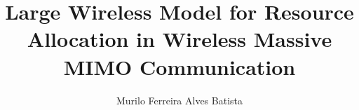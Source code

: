 

\def\titlefontStandardSerif{} 





\author{Murilo Ferreira Alves Batista}
\title{Large Wireless Model for Resource Allocation in Wireless Massive MIMO Communication}
\def\titlelineA{~}
\def\titlelineB{Large Wireless Model}
\def\titlelineC{for Resource Allocation in Wireless }
\def\titlelineD{Massive MIMO Communication}
\def\thesistype{master's thesis}
\def\thesistypegerman{Masterarbeit}
\def\expecteddegree{Master of Science}
\def\fieldofstudy{Electrical Engineering, Information Technology and Computer Engineering}
\def\supervisor{Dr.-Ing. Shirin Salehi} %

